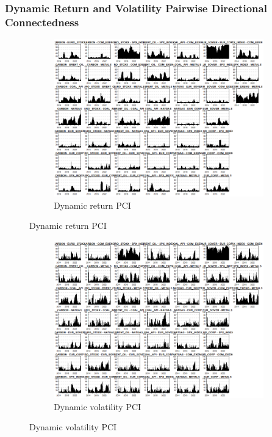 \documentclass[preprint, 3p,
authoryear]{elsarticle} %
\begin{document}
\begin{landscape}
\newpage

\subsubsection{Dynamic Return and Volatility Pairwise Directional Connectedness}

\begin{figure}[!ht]
  \caption{Dynamic Return and Volatility Pairwise Connectedness Index (Jan 2013 – Jan 2025)}
  \centering
  \begin{subfigure}[a]{\textwidth}
    \caption{Dynamic return PCI}
    \includegraphics[width = 1.1\linewidth]{13aApdxD-10-220-RetPCI}
  \end{subfigure}
\end{figure}
\begin{figure}[!ht]
  \ContinuedFloat
  \centering
    \begin{subfigure}[b]{\textwidth}\ContinuedFloat
      \caption{Dynamic volatility PCI}
      \includegraphics[width = 1.2\linewidth]{13bApdxD-10-220-VolPCI}
    \end{subfigure}
\end{figure}







\end{landscape}
\end{document}
